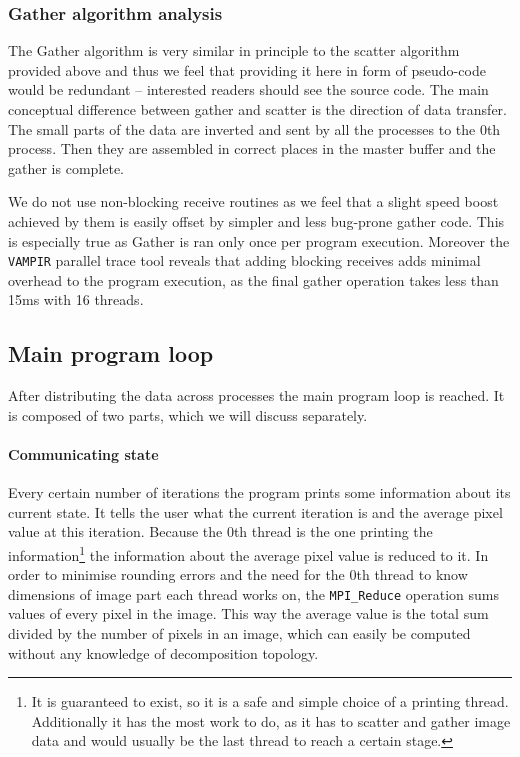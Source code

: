 \documentclass[11pt,a4paper]{article}
\begin{document}
\subsubsection{Gather algorithm analysis}
The Gather algorithm is very similar in principle to the scatter algorithm provided above and thus we feel that providing it here in form of pseudo-code would be redundant -- interested readers should see the source code. 
The main conceptual difference between gather and scatter is the direction of data transfer. 
The small parts of the data are inverted and sent by all the processes to the 0th process. 
Then they are assembled in correct places in the master buffer and the gather is complete.

We do not use non-blocking receive routines as we feel that a slight speed boost achieved by them is easily offset by simpler and less bug-prone gather code. 
This is especially true as Gather is ran only once per program execution. 
Moreover the \texttt{VAMPIR} parallel trace tool reveals that adding blocking receives adds minimal overhead to the program execution, as the final gather operation takes less than 15ms with 16 threads.

\subsection{Main program loop}
After distributing the data across processes the main program loop is reached. It is composed of two parts, which we will discuss separately.

\paragraph{Communicating state}
Every certain number of iterations the program prints some information about its current state. 
It tells the user what the current iteration is and the average pixel value at this iteration.
Because the 0th thread is the one printing the information\footnote{It is guaranteed to exist, so it is a safe and simple choice of a printing thread. Additionally it has the most work to do, as it has to scatter and gather image data and would usually be the last thread to reach a certain stage.} the information about the average pixel value is reduced to it. 
In order to minimise rounding errors and the need for the 0th thread to know dimensions of image part each thread works on, the \texttt{MPI\_Reduce} operation sums values of every pixel in the image.
This way the average value is the total sum divided by the number of pixels in an image, which can easily be computed without any knowledge of decomposition topology.
\end{document}
